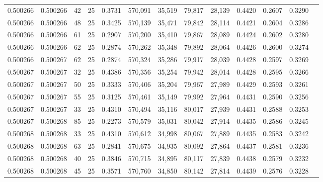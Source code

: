 \begin{tabular}{rrrrrrrrrrrrr}
0.500266 & 0.500266 &    42 &  25 &                                     0.3731 & 570,091 &  35,519 &  79,817 &  28,139 & 0.4420 & 0.2607 & 0.3290 \\
0.500266 & 0.500266 &    48 &  25 &                                     0.3425 & 570,139 &  35,471 &  79,842 &  28,114 & 0.4421 & 0.2604 & 0.3286 \\
0.500266 & 0.500266 &    61 &  25 &                                     0.2907 & 570,200 &  35,410 &  79,867 &  28,089 & 0.4424 & 0.2602 & 0.3280 \\
0.500266 & 0.500266 &    62 &  25 &                                     0.2874 & 570,262 &  35,348 &  79,892 &  28,064 & 0.4426 & 0.2600 & 0.3274 \\
0.500266 & 0.500267 &    62 &  25 &                                     0.2874 & 570,324 &  35,286 &  79,917 &  28,039 & 0.4428 & 0.2597 & 0.3269 \\
0.500267 & 0.500267 &    32 &  25 &                                     0.4386 & 570,356 &  35,254 &  79,942 &  28,014 & 0.4428 & 0.2595 & 0.3266 \\
0.500267 & 0.500267 &    50 &  25 &                                     0.3333 & 570,406 &  35,204 &  79,967 &  27,989 & 0.4429 & 0.2593 & 0.3261 \\
0.500267 & 0.500267 &    55 &  25 &                                     0.3125 & 570,461 &  35,149 &  79,992 &  27,964 & 0.4431 & 0.2590 & 0.3256 \\
0.500267 & 0.500267 &    33 &  25 &                                     0.4310 & 570,494 &  35,116 &  80,017 &  27,939 & 0.4431 & 0.2588 & 0.3253 \\
0.500267 & 0.500268 &    85 &  25 &                                     0.2273 & 570,579 &  35,031 &  80,042 &  27,914 & 0.4435 & 0.2586 & 0.3245 \\
0.500268 & 0.500268 &    33 &  25 &                                     0.4310 & 570,612 &  34,998 &  80,067 &  27,889 & 0.4435 & 0.2583 & 0.3242 \\
0.500268 & 0.500268 &    63 &  25 &                                     0.2841 & 570,675 &  34,935 &  80,092 &  27,864 & 0.4437 & 0.2581 & 0.3236 \\
0.500268 & 0.500268 &    40 &  25 &                                     0.3846 & 570,715 &  34,895 &  80,117 &  27,839 & 0.4438 & 0.2579 & 0.3232 \\
0.500268 & 0.500268 &    45 &  25 &                                     0.3571 & 570,760 &  34,850 &  80,142 &  27,814 & 0.4439 & 0.2576 & 0.3228 \\

\end{tabular}
